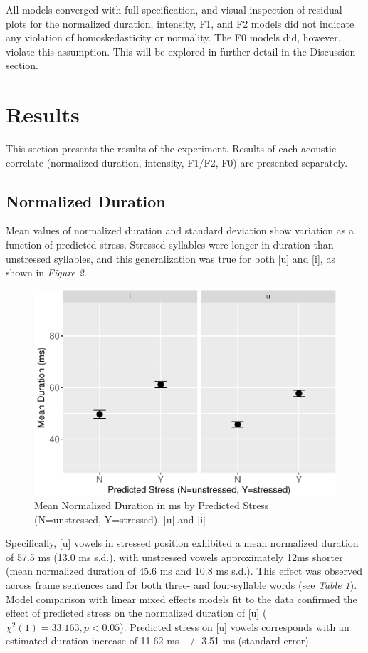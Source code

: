 \documentclass[english,man]{apa6}
\theoremstyle{definition}
\theoremstyle{definition}
\theoremstyle{definition}
\theoremstyle{remark}
\begin{document}
All models converged with full specification, and visual inspection of
residual plots for the normalized duration, intensity, F1, and F2 models
did not indicate any violation of homoskedasticity or normality. The F0
models did, however, violate this assumption. This will be explored in
further detail in the Discussion section.

\section{Results}\label{results}

This section presents the results of the experiment. Results of each
acoustic correlate (normalized duration, intensity, F1/F2, F0) are
presented separately.

\subsection{Normalized Duration}\label{normalized-duration}

Mean values of normalized duration and standard deviation show variation
as a function of predicted stress. Stressed syllables were longer in
duration than unstressed syllables, and this generalization was true for
both {[}u{]} and {[}i{]}, as shown in \textit{Figure 2}.

\begin{figure}
\centering
\includegraphics{lithuanian_article_files/figure-latex/Figure2-1.pdf}
\caption{\label{fig:Figure2}Mean Normalized Duration in ms by Predicted
Stress (N=unstressed, Y=stressed), {[}u{]} and {[}i{]}}
\end{figure}

Specifically, {[}u{]} vowels in stressed position exhibited a mean
normalized duration of 57.5 ms (13.0 ms s.d.), with unstressed vowels
approximately 12ms shorter (mean normalized duration of 45.6 ms and 10.8
ms s.d.). This effect was observed across frame sentences and for both
three- and four-syllable words (see \textit{Table 1}). Model comparison
with linear mixed effects models fit to the data confirmed the effect of
predicted stress on the normalized duration of {[}u{]}
(\(\chi^2(1) = 33.163, p < 0.05\)). Predicted stress on {[}u{]} vowels
corresponds with an estimated duration increase of 11.62 ms +/- 3.51 ms
(standard error).
\end{document}
